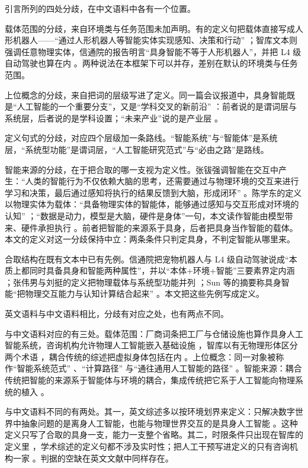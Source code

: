 \documentclass[10pt,fontset=fandol]{ctexart}
\begin{document}
引言所列的四处分歧，在中文语料中各有一个位置。

载体范围的分歧，来自环境类与任务范围未加声明。有的定义句把载体直接写成人形机器人——“通过人形机器人等智能实体实现感知、决策和行动” \cite{kejiribao2024}；智库文本则强调任意物理实体，信通院的报告明言“具身智能不等于人形机器人”，并把 L4 级自动驾驶也算在内 \cite{caict2024}。两种说法在本框架下可以并存，差别在默认的环境类与任务范围。

上位概念的分歧，来自把词的层级写进了定义。同一篇会议报道中，具身智能既是“人工智能的一个重要分支”，又是“学科交叉的新前沿” \cite{ia2025}：前者说的是谓词层与系统层，后者说的是学科设置；“未来产业”说的是产业层 \cite{govreport2025}。

定义句式的分歧，对应四个层级加一条路线。“智能系统”与“智能体”是系统层，“系统型功能”是谓词层，“人工智能研究范式”与“必由之路”是路线。

智能来源的分歧，在于把合取的哪一支视为定义性。张钹强调智能在交互中产生：“人类的智能行为不仅依赖大脑的思考，还需要通过与物理环境的交互来进行学习和决策，最后通过感知将执行的结果反馈到大脑，形成闭环” \cite{zhangbo2025}。陈学东的定义以物理实体为载体：“具备物理实体的智能体，能够通过感知与交互形成对环境的认知” \cite{chenxd2026}；“数据是动力，模型是大脑，硬件是身体”一句，本文读作智能由模型带来、硬件承担执行 \cite{chenxd2026}。前者把智能的来源系于具身，后者把具身当作智能的载体。本文的定义对这一分歧保持中立：两条条件只判定具身，不判定智能从哪里来。

合取结构在既有文本中已有先例。信通院把宠物机器人与 L4 级自动驾驶说成“本质上都同时具备具身和智能两种属性”，并以“本体+环境+智能”三要素界定内涵 \cite{caict2024}；张伟男与刘挺的定义把物理载体与系统型功能并列 \cite{zhangwei2025}；Sun 等的摘要称具身智能“把物理交互能力与认知计算结合起来” \cite{sun2024}。本文把这些先例写成定义。

英文语料与中文语料相比，分歧有对应之处，也有两点不同。

与中文语料对应的有三处。载体范围：厂商词条把工厂与仓储设施也算作具身人工智能系统，咨询机构允许物理人工智能嵌入基础设施 \cite{nvglossary,mckinsey2026}，智库以有无物理形体区分两个术语 \cite{cset2026}，耦合传统的综述把虚拟身体包括在内 \cite{liu2025csur}。上位概念：同一对象被称作“智能系统范式” \cite{feng2025}、“计算路径” \cite{liu2025csur} 与“通往通用人工智能的路径” \cite{sun2024}。智能来源：耦合传统把智能的来源系于智能体与环境的耦合，集成传统把它系于人工智能向物理系统的植入 \cite{nvglossary}。

与中文语料不同的有两处。其一，英文综述多以按环境划界来定义：只解决数字世界中抽象问题的是离身人工智能，也能与物理世界交互的是具身人工智能 \cite{feng2025,liu2024survey}。这种定义只写了合取的具身一支，能力一支整个省略。其二，时限条件只出现在智库的定义里 \cite{cset2026}，学术综述的定义句都不涉及实时性；把人工干预写进定义的只有咨询机构一家 \cite{mckinsey2026}。判据的空缺在英文文献中同样存在。
\end{document}
